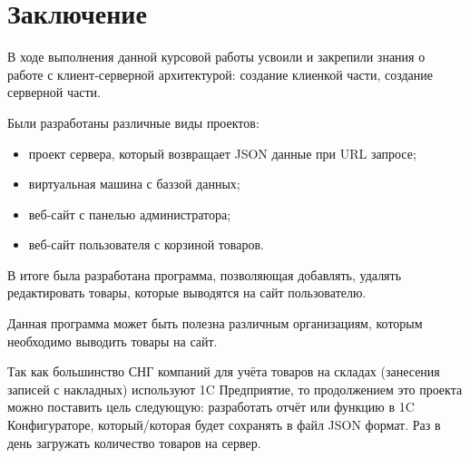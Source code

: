 \newpage

\section*{Заключение}

В ходе выполнения данной курсовой работы усвоили и закрепили знания о работе с клиент-серверной архитектурой:
создание клиенкой части, создание серверной части.

Были разработаны различные виды проектов:

\begin{itemize}
    \item проект сервера, который возвращает JSON данные при URL запросе;
    \item виртуальная машина с баззой данных;
    \item веб-сайт с панелью администратора;
    \item веб-сайт пользователя с корзиной товаров.
\end{itemize}
	
В итоге была разработана программа,
позволяющая добавлять, удалять редактировать товары, которые выводятся на сайт пользователю.

Данная программа может быть полезна различным организациям,
которым необходимо выводить товары на сайт.

Так как большинство СНГ компаний для учёта товаров на складах (занесения записей с накладных) используют
1C Предприятие, то продолжением это проекта можно поставить цель следующую: 
разработать отчёт или функцию в 1C Конфигураторе, который/которая будет сохранять в файл JSON формат.
Раз в день загружать количество товаров на сервер.  

\newpage
